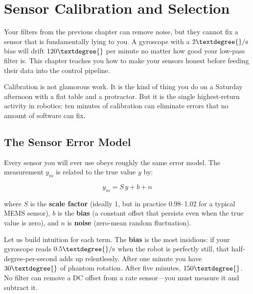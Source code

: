 \section{Sensor Calibration and Selection}

Your filters from the previous chapter can remove noise, but they cannot fix a sensor that is fundamentally lying to you. A gyroscope with a $2\textdegree{}/\mathrm{s}$ bias will drift $120\textdegree{}$ per minute no matter how good your low-pass filter is. This chapter teaches you how to make your sensors honest before feeding their data into the control pipeline.

Calibration is not glamorous work. It is the kind of thing you do on a Saturday afternoon with a flat table and a protractor. But it is the single highest-return activity in robotics: ten minutes of calibration can eliminate errors that no amount of software can fix.

\subsection{The Sensor Error Model}

Every sensor you will ever use obeys roughly the same error model. The measurement $y_m$ is related to the true value $y$ by:

\begin{equation}
y_m = S \, y + b + n
\end{equation}

where $S$ is the \textbf{scale factor} (ideally 1, but in practice 0.98--1.02 for a typical MEMS sensor), $b$ is the \textbf{bias} (a constant offset that persists even when the true value is zero), and $n$ is \textbf{noise} (zero-mean random fluctuation).

Let us build intuition for each term. The \textbf{bias} is the most insidious: if your gyroscope reads $0.5\textdegree{}/\mathrm{s}$ when the robot is perfectly still, that half-degree-per-second adds up relentlessly. After one minute you have $30\textdegree{}$ of phantom rotation. After five minutes, $150\textdegree{}$. No filter can remove a DC offset from a rate sensor---you must measure it and subtract it.


